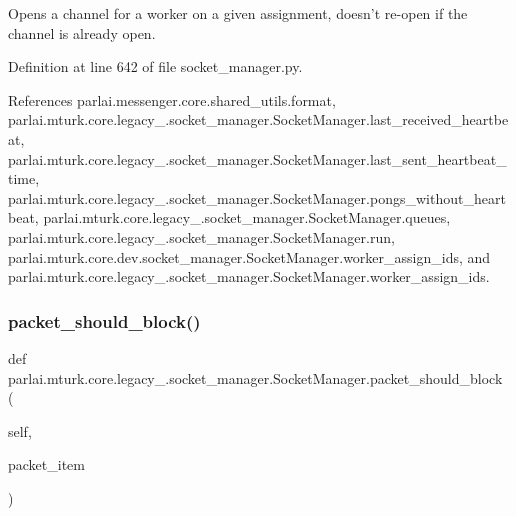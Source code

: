 \begin{DoxyVerb}Opens a channel for a worker on a given assignment, doesn't re-open
if the channel is already open.\end{DoxyVerb}
 

Definition at line 642 of file socket\+\_\+manager.\+py.



References parlai.\+messenger.\+core.\+shared\+\_\+utils.\+format, parlai.\+mturk.\+core.\+legacy\+\_.\+socket\+\_\+manager.\+Socket\+Manager.\+last\+\_\+received\+\_\+heartbeat, parlai.\+mturk.\+core.\+legacy\+\_.\+socket\+\_\+manager.\+Socket\+Manager.\+last\+\_\+sent\+\_\+heartbeat\+\_\+time, parlai.\+mturk.\+core.\+legacy\+\_.\+socket\+\_\+manager.\+Socket\+Manager.\+pongs\+\_\+without\+\_\+heartbeat, parlai.\+mturk.\+core.\+legacy\+\_.\+socket\+\_\+manager.\+Socket\+Manager.\+queues, parlai.\+mturk.\+core.\+legacy\+\_.\+socket\+\_\+manager.\+Socket\+Manager.\+run, parlai.\+mturk.\+core.\+dev.\+socket\+\_\+manager.\+Socket\+Manager.\+worker\+\_\+assign\+\_\+ids, and parlai.\+mturk.\+core.\+legacy\+\_.\+socket\+\_\+manager.\+Socket\+Manager.\+worker\+\_\+assign\+\_\+ids.

\mbox{\label{classparlai_1_1mturk_1_1core_1_1legacy__2018_1_1socket__manager_1_1SocketManager_a8793f6a47fa15f3b76b3660240563492}} 
\subsubsection{\texorpdfstring{packet\+\_\+should\+\_\+block()}{packet\_should\_block()}}
{\footnotesize\ttfamily def parlai.\+mturk.\+core.\+legacy\+\_.\+socket\+\_\+manager.\+Socket\+Manager.\+packet\+\_\+should\+\_\+block (\begin{DoxyParamCaption}\item[{}]{self,  }\item[{}]{packet\+\_\+item }\end{DoxyParamCaption})}

